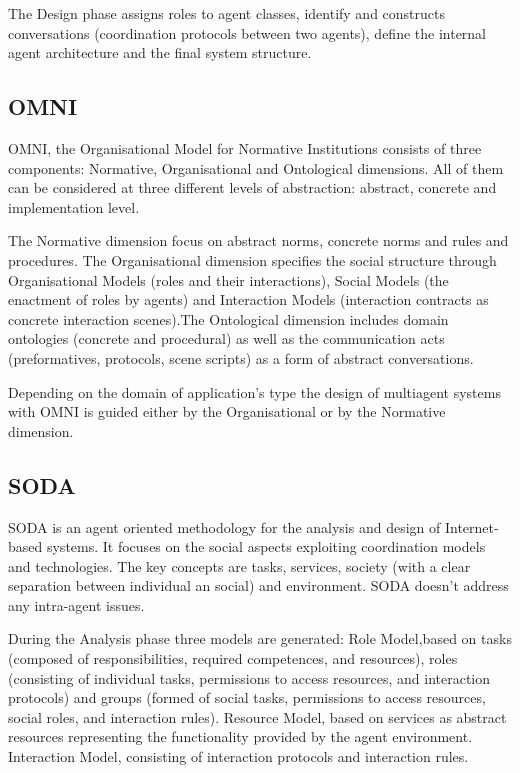 \documentclass{article}
\begin{document}
The Design phase assigns roles to agent classes, identify and constructs conversations (coordination protocols between two agents), define the internal agent architecture and the final system structure. 

\subsection{OMNI}

OMNI, the Organisational Model for Normative Institutions \cite{journals/aamas/Vazquez-SalcedaDD05} consists of three components: Normative, Organisational and Ontological dimensions. All of them can be considered at three different levels of abstraction: abstract, concrete and implementation level.

The Normative dimension focus on abstract norms, concrete norms and rules and procedures. The Organisational dimension specifies the social structure through Organisational Models (roles and their interactions), Social Models (the enactment of roles by agents) and Interaction Models (interaction contracts as concrete interaction scenes).The Ontological dimension includes domain ontologies (concrete and procedural) as well as the communication acts (preformatives, protocols, scene scripts) as a form of abstract conversations.

Depending on the domain of application's type the design of multiagent systems with OMNI is guided either by the Organisational or by the Normative dimension.

\subsection{SODA}

SODA \cite{conf/aose/Omicini00} is an agent oriented methodology for the analysis and design of Internet-based systems. It focuses on the social aspects  exploiting coordination models and technologies. The key concepts are tasks, services, society (with a clear separation between individual an social) and environment. SODA doesn't address any intra-agent issues.

During the Analysis phase three models are generated: Role Model,based on tasks (composed of responsibilities, required competences, and resources), roles (consisting of individual tasks, permissions to access resources, and interaction protocols) and groups (formed of social tasks, permissions to access resources, social roles, and interaction rules). Resource Model, based on services as abstract resources representing the functionality provided by the agent environment. Interaction Model, consisting of interaction protocols and interaction rules.
\end{document}
